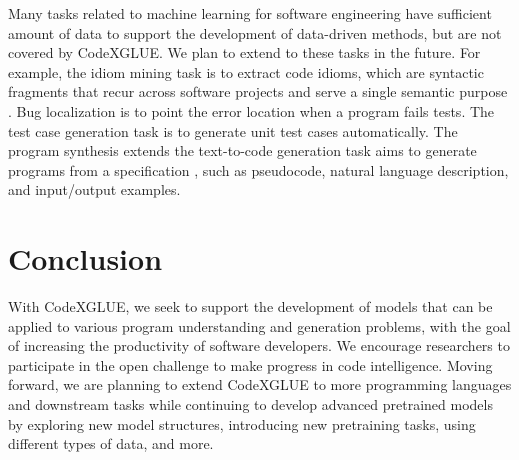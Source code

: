 \documentclass[sigconf,nonacm,screen]{acmart}
\begin{document}
Many tasks related to machine learning for software engineering \cite{allamanis2018survey} have sufficient amount of data to support the development of data-driven methods, but are not covered by CodeXGLUE.
We plan to extend to these tasks in the future. 
For example,
the {idiom mining task} \cite{allamanis2014mining,iyer2019learning} is to extract code idioms, which are syntactic fragments that recur across software projects and serve a single semantic purpose \cite{allamanis2014mining}. 
{Bug localization} \cite{ray2016naturalness,gupta2019neural,vasic2019neural} is to point the error location when a program fails tests. 
The {test case generation} task \cite{fraser2011evosuite,tufano2020unit} is to generate unit test cases automatically. 
The {program synthesis}  \cite{neelakantan2015neural,reed2015neural,singh2015predicting,vijayaraghavan2017bayesian,feser2015syn,kulal2019spoc,zhong2020semantic} extends the text-to-code generation task aims to generate programs from a specification \citep{gulwani2017program}, such as pseudocode, natural language description,  and input/output examples. 




\section{Conclusion}
With CodeXGLUE, we seek to support the development of models that can be applied to various program understanding and generation problems, with the goal of increasing the productivity of software developers. We encourage researchers to participate in the open challenge to make progress in code intelligence. Moving forward, we are planning to extend CodeXGLUE to more programming languages and downstream tasks while continuing to develop advanced pretrained models by exploring new model structures, introducing new pretraining tasks, using different types of data, and more.









\appendix
\end{document}

